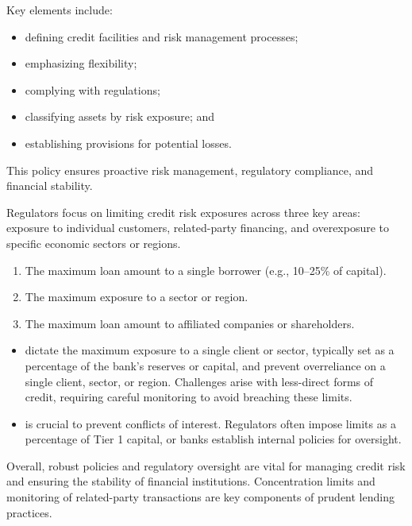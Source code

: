 Key elements include:

\begin{itemize}
\item defining credit facilities and risk management processes;
\item emphasizing flexibility;
\item complying with regulations;
\item classifying assets by risk exposure; and
\item establishing provisions for potential losses.
\end{itemize}

This policy ensures proactive risk management, regulatory compliance, and
financial stability.


Regulators focus on limiting credit risk exposures across three key areas:
exposure to individual customers, related-party financing, and overexposure to
specific economic sectors or regions.

\begin{enumerate}
\item {} The maximum loan amount to a single borrower (e.g.,
10--25\% of capital).
\item {} The maximum exposure to a sector or region.
\item {} The maximum loan amount to affiliated companies or
shareholders.
\end{enumerate}

\begin{itemize}
\item {} dictate the maximum exposure to a single
client or sector, typically set as a percentage of the bank's reserves or
capital, and prevent overreliance on a single client, sector, or region.
Challenges arise with less-direct forms of credit, requiring careful monitoring
to avoid breaching these limits.
\item {} is crucial to prevent
conflicts of interest. Regulators often impose limits as a percentage of Tier 1
capital, or banks establish internal policies for oversight.
\end{itemize}

Overall, robust policies and regulatory oversight are vital for managing credit
risk and ensuring the stability of financial institutions. Concentration limits
and monitoring of related-party transactions are key components of prudent
lending practices.

